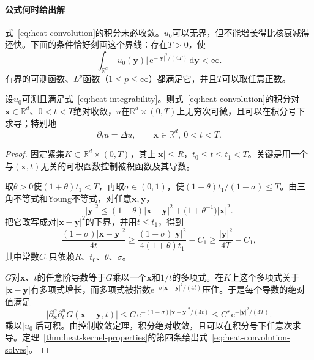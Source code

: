 \paragraph{公式何时给出解}
式~\eqref{eq:heat-convolution}的积分未必收敛。$u_0$可以无界，但不能增长得比核衰减得还快。下面的条件恰好刻画这个界线：存在$T>0$，使
\begin{equation}
 \int_{\mathbb{R}^{d}}\lvert u_0(\bm{y})\rvert\,\mathrm{e}^{-\lvert\bm{y}\rvert^2/(4T)}\,\mathrm{d}\bm{y}<\infty .
 \label{eq:heat-integrability}
\end{equation}
有界的可测函数、$L^p$函数（$1\leq p\leq\infty$）都满足它，并且$T$可以取任意正数。

\begin{theorem}[卷积解的可微性]
\label{thm:heat-convolution-smooth}
设$u_0$可测且满足式~\eqref{eq:heat-integrability}。则式~\eqref{eq:heat-convolution}的积分对$\bm{x}\in\mathbb{R}^{d}$、$0<t<T$绝对收敛，$u$在$\mathbb{R}^{d}\times(0,T)$上无穷次可微，且可以在积分号下求导；特别地
\begin{equation}
 \partial_tu=\Delta u,\qquad \bm{x}\in\mathbb{R}^{d},\ 0<t<T .
 \label{eq:heat-convolution-solves}
\end{equation}
\end{theorem}

\begin{proof}
固定紧集$K\subset\mathbb{R}^{d}\times(0,T)$，其上$\lvert\bm{x}\rvert\leq R$，$t_0\leq t\leq t_1<T$。关键是用一个与$(\bm{x},t)$无关的可积函数控制被积函数及其导数。

取$\theta>0$使$(1+\theta)t_1<T$，再取$\sigma\in(0,1)$，使$(1+\theta)t_1/(1-\sigma)\leq T$。由三角不等式和Young不等式，对任意$\bm{x},\bm{y}$，
\[
 \lvert\bm{y}\rvert^2\leq(1+\theta)\lvert\bm{x}-\bm{y}\rvert^2+\bigl(1+\theta^{-1}\bigr)\lvert\bm{x}\rvert^2 .
\]
把它改写成对$\lvert\bm{x}-\bm{y}\rvert^2$的下界，并用$t\leq t_1$，得到
\[
 \frac{(1-\sigma)\lvert\bm{x}-\bm{y}\rvert^2}{4t}\geq\frac{(1-\sigma)\lvert\bm{y}\rvert^2}{4(1+\theta)t_1}-C_1\geq\frac{\lvert\bm{y}\rvert^2}{4T}-C_1 ,
\]
其中常数$C_1$只依赖$R$、$t_0$、$\theta$、$\sigma$。

$G$对$\bm{x}$、$t$的任意阶导数等于$G$乘以一个$\bm{x}$和$1/t$的多项式。在$K$上这个多项式关于$\lvert\bm{x}-\bm{y}\rvert$有多项式增长，而多项式被指数$\mathrm{e}^{-\sigma\lvert\bm{x}-\bm{y}\rvert^2/(4t)}$压住。于是每个导数的绝对值满足
\[
 \bigl\lvert\partial^{\alpha}_{\bm{x}}\partial_t^{n}G(\bm{x}-\bm{y},t)\bigr\rvert\leq C\,\mathrm{e}^{-(1-\sigma)\lvert\bm{x}-\bm{y}\rvert^2/(4t)}\leq C'\,\mathrm{e}^{-\lvert\bm{y}\rvert^2/(4T)} .
\]
乘以$\lvert u_0\rvert$后可积。由控制收敛定理，积分绝对收敛，且可以在积分号下任意次求导。定理~\ref{thm:heat-kernel-properties}的第四条给出式~\eqref{eq:heat-convolution-solves}。
\end{proof}

